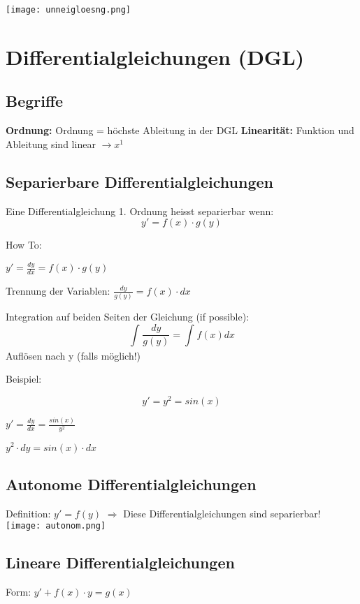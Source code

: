 \begin{multicols*}{3}
    \texttt{[image: unneigloesng.png]}

    \section{Differentialgleichungen (DGL)}
    \subsection{Begriffe}
    {\textbf{Ordnung:} Ordnung = höchste Ableitung in der DGL}
    {\textbf{Linearität:} Funktion und Ableitung sind linear $\rightarrow x^1$ }

    \subsection{Separierbare Differentialgleichungen}
    {Eine Differentialgleichung 1. Ordnung heisst separierbar wenn:}
    $$ y' = f(x)\cdot g(y)$$

    {How To:}

    $y' = \frac{dy}{dx} = f(x)\cdot g(y) $

     {Trennung der Variablen:} $\frac{dy}{g(y)} = f(x)\cdot dx$

     {Integration auf beiden Seiten der Gleichung (if possible):} $$\int_{}^{}{\frac{dy}{g(y)}=\int_{}^{}f(x)dx}$$
     {Auflösen nach y (falls möglich!)}

    \begin{multicols}{2}
        {Beispiel:}

        $$y' = y^2 = sin(x)$$

         $y' = \frac{dy}{dx}=\frac{sin(x)}{y^2}$

         $y^2\cdot dy = sin(x)\cdot dx $
        \columnbreak



    \end{multicols}



    \subsection{Autonome Differentialgleichungen}
    {Definition: $y' = f(y)$}
    {$\Rightarrow$ Diese Differentialgleichungen sind separierbar!}
    \texttt{[image: autonom.png]}

    \subsection{ Lineare Differentialgleichungen}
    {\large Form: $y' + f(x) \cdot y = g(x)$}


\end{multicols*}
